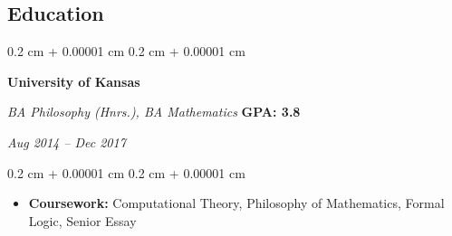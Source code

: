 \documentclass[10pt, letterpaper]{article}
\newenvironment{highlights}{ \begin{itemize}[ topsep=0.10 cm, parsep=0.10 cm, partopsep=0pt,
itemsep=0pt, leftmargin=0.4 cm + 10pt ] }{ \end{itemize} } %
\newenvironment{onecolentry}{ \begin{adjustwidth}{ 0.2 cm + 0.00001 cm }{ 0.2 cm + 0.00001 cm }
}{ \end{adjustwidth}} %
\newenvironment{twocolentry}[2][]{ \onecolentry \def\secondColumn{#2} \setcolumnwidth{\fill, 10 cm}
\begin{paracol}{2} }{ \switchcolumn \raggedleft \secondColumn \end{paracol}
\endonecolentry } %
\begin{document}
	\begin{samepage}
		\section{Education}

		\begin{twocolentry}
			{ \textbf{GPA: 3.8}

			\textit{Aug 2014 -- Dec 2017}} \textbf{University of Kansas}

			\textit{BA Philosophy (Hnrs.), BA Mathematics}
		\end{twocolentry}

		\vspace{0.10 cm}
		\begin{onecolentry}
			\begin{highlights}
				\item \textbf{Coursework:} Computational Theory, Philosophy of Mathematics,
				Formal Logic, Senior Essay
			\end{highlights}
		\end{onecolentry}
	\end{samepage}
\end{document}
